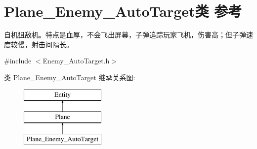 \hypertarget{class_plane___enemy___auto_target}{}\section{Plane\+\_\+\+Enemy\+\_\+\+Auto\+Target类 参考}
\label{class_plane___enemy___auto_target}


自机狙敌机。特点是血厚，不会飞出屏幕，子弹追踪玩家飞机，伤害高；但子弹速度较慢，射击间隔长。  




{\ttfamily \#include $<$Enemy\+\_\+\+Auto\+Target.\+h$>$}

类 Plane\+\_\+\+Enemy\+\_\+\+Auto\+Target 继承关系图\+:\begin{figure}[H]
\begin{center}
\leavevmode
\includegraphics[height=3.000000cm]{class_plane___enemy___auto_target}
\end{center}
\end{figure}
